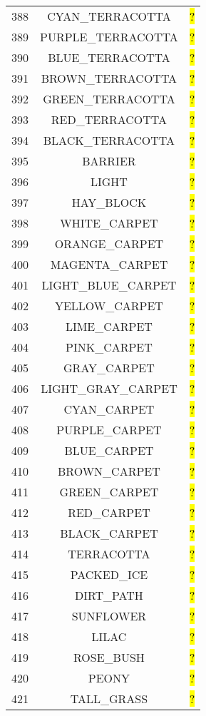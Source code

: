 \documentclass[11pt]{article}
\newcommand\myworries[1]{\sethlcolor{red}\hl{#1}}
\begin{document}
\begin{longtable}{ |c|c|c| }
388 & CYAN\_TERRACOTTA & \myworries{?} \\
389 & PURPLE\_TERRACOTTA & \myworries{?} \\
390 & BLUE\_TERRACOTTA & \myworries{?} \\
391 & BROWN\_TERRACOTTA & \myworries{?} \\
392 & GREEN\_TERRACOTTA & \myworries{?} \\
393 & RED\_TERRACOTTA & \myworries{?} \\
394 & BLACK\_TERRACOTTA & \myworries{?} \\
395 & BARRIER & \myworries{?} \\
396 & LIGHT & \myworries{?} \\
397 & HAY\_BLOCK & \myworries{?} \\
398 & WHITE\_CARPET & \myworries{?} \\
399 & ORANGE\_CARPET & \myworries{?} \\
400 & MAGENTA\_CARPET & \myworries{?} \\
401 & LIGHT\_BLUE\_CARPET & \myworries{?} \\
402 & YELLOW\_CARPET & \myworries{?} \\
403 & LIME\_CARPET & \myworries{?} \\
404 & PINK\_CARPET & \myworries{?} \\
405 & GRAY\_CARPET & \myworries{?} \\
406 & LIGHT\_GRAY\_CARPET & \myworries{?} \\
407 & CYAN\_CARPET & \myworries{?} \\
408 & PURPLE\_CARPET & \myworries{?} \\
409 & BLUE\_CARPET & \myworries{?} \\
410 & BROWN\_CARPET & \myworries{?} \\
411 & GREEN\_CARPET & \myworries{?} \\
412 & RED\_CARPET & \myworries{?} \\
413 & BLACK\_CARPET & \myworries{?} \\
414 & TERRACOTTA & \myworries{?} \\
415 & PACKED\_ICE & \myworries{?} \\
416 & DIRT\_PATH & \myworries{?} \\
417 & SUNFLOWER & \myworries{?} \\
418 & LILAC & \myworries{?} \\
419 & ROSE\_BUSH & \myworries{?} \\
420 & PEONY & \myworries{?} \\
421 & TALL\_GRASS & \myworries{?} \\

\end{longtable}
\end{document}
